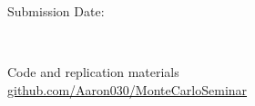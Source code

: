 \begin{titlepage}
\begin{center}
\begin{large}
Submission Date: \date{\today} \\

{}

\end{large}
\end{center}

\vfill

\begin{center}
\small
Code and replication materials\\
\href{https://github.com/Aaron030/MonteCarloSeminar}{github.com/Aaron030/MonteCarloSeminar}
\end{center}

\end{titlepage}